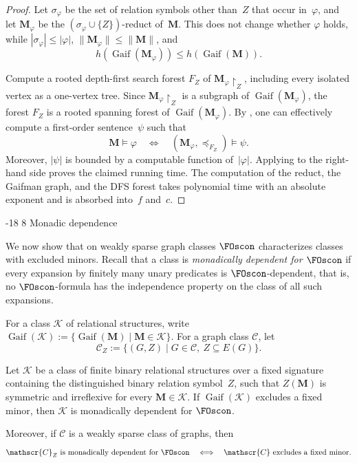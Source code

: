 \documentclass[1p,number,11pt]{elsarticle}
\makeatletter
\renewcommand\subsection{\@startsection{subsection}{2}{\z@}%
  {-18\p@ \@plus -4\p@ \@minus -4\p@}%
  {8\p@ \@plus 4\p@ \@minus 4\p@}%
  {\normalfont\normalsize\bfseries}}
\newcommand{\Gaif}{\operatorname{Gaif}}
\theoremstyle{plain}
\newcommand{\Cc}{\mathscr{C}}
\renewcommand{\leq}{\leqslant}
\makeatother
\begin{document}
\begin{proof}
Let $\sigma_\varphi$ be the set of relation symbols other than~$Z$ that occur
in~$\varphi$, and let $\mathbf M_\varphi$ be the
$(\sigma_\varphi\cup\{Z\})$-reduct of~$\mathbf M$. This does not change
whether $\varphi$ holds, while
$|\sigma_\varphi|\leq|\varphi|$,
$\|\mathbf M_\varphi\|\leq\|\mathbf M\|$, and
\[
 h(\Gaif(\mathbf M_\varphi))
 \leq h(\Gaif(\mathbf M)).
\]

Compute a rooted depth-first search forest $F_Z$ of
$\mathbf M_\varphi\!\upharpoonright_Z$, including every isolated vertex as a
one-vertex tree. Since $\mathbf M_\varphi\!\upharpoonright_Z$ is a subgraph of
$\Gaif(\mathbf M_\varphi)$, the forest $F_Z$ is a rooted spanning forest of
$\Gaif(\mathbf M_\varphi)$. By , one can effectively
compute a first-order sentence~$\psi$ such that
\[
   \mathbf M\models\varphi
   \quad\Longleftrightarrow\quad
   (\mathbf M_\varphi,\preceq_{F_Z})\models\psi.
\]
Moreover, $|\psi|$ is bounded by a computable function of~$|\varphi|$.
Applying  to the right-hand side proves the claimed
running time. The computation of the reduct, the Gaifman graph, and the DFS
forest takes polynomial time with an absolute exponent and is absorbed
into~$f$ and~$c$.
\end{proof}

\subsection{Monadic dependence}\label{subsec:dependence}

We now show that on weakly sparse graph classes $\FOscon$ characterizes classes with excluded minors. Recall that a class is \emph{monadically dependent for $\FOscon$} if every expansion by finitely many unary predicates is $\FOscon$-dependent, that is, no $\FOscon$-formula
has the independence property on the class of all such expansions.

For a class $\mathscr K$ of relational structures, write
$\Gaif(\mathscr K):=\{\Gaif(\mathbf M)\mid \mathbf M\in\mathscr K\}$.  For a graph class
$\Cc$, let
\[
   \Cc_Z
   :=
   \{(G,Z)\mid G\in\Cc,\ Z\subseteq E(G)\}.
\]


\begin{theorem}[store=thm:dependence,
    restate-keys={note=see \zcpageref[nocap]{thm:dependence}}]
Let $\mathscr K$ be a class of finite binary relational structures over a fixed
signature containing the distinguished binary relation symbol~$Z$, such that
$Z(\mathbf M)$ is symmetric and irreflexive for every
$\mathbf M\in\mathscr K$. If
$\Gaif(\mathscr K)$ excludes a fixed minor, then $\mathscr K$ is monadically
dependent for $\FOscon$.

Moreover, if $\Cc$ is a weakly sparse class of graphs, then
\[
   \Cc_Z\text{ is monadically dependent for }\FOscon
   \quad\Longleftrightarrow\quad
   \Cc\text{ excludes a fixed minor}.
\]
\end{theorem}
\end{document}
